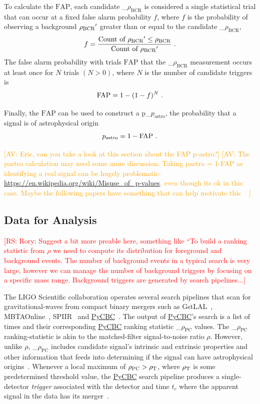 \documentclass[%
 nofootinbib,
 amsmath,amssymb,
 aps,
 twocolumn,
 superscriptaddress
]{revtex4-2}
\newcommand{\gstlal}{{\sc GstLAL}\xspace}
\newcommand{\spiir}{{\sc SPIIR}\xspace}
\newcommand{\mbta}{{\sc MBTAOnline}\xspace}
\newcommand{\pycbc}{{\sc \href{https://pycbc.org/}{{PyCBC}}}\xspace}
\newcommand{\fancytext}[1]{{\relax\ifmmode#1\else $#1$\fi}\xspace}
\newcommand{\mathcmd}[1]{{\sc \relax\ifmmode#1\else $#1$\fi}\xspace}
\newcommand{\bcr}{\mathcmd{\rho_\text{BCR}}}
\newcommand{\pycbcstat}{\mathcmd{\rho_\text{PC}}}
\newcommand{\snr}{\mathcmd{\rho}}
\newcommand{\fap}{\mathcmd{\text{FAP}}}
\newcommand{\pastro}{\fancytext{p_\text{astro}}}
\newcommand{\avi}[1]{\textcolor{orange}{[AV: #1]}}
\newcommand{\rs}[1]{\textcolor{red}{[RS: #1]}}
\begin{document}
To calculate the \fap, each candidate \bcr is considered a single statistical trial that can occur at a fixed false alarm probability $f$, where $f$ is the probability of observing a background $\bcr'$ greater than or equal to the candidate \bcr,
\begin{equation}
    f = \frac{\text{Count of } \bcr' \leq \bcr}{\text{Count of } \bcr'} \ .
\end{equation}
The false alarm probability with trials \fap that the \bcr measurement occurs at least once for $N$ trials $(N > 0)$, where $N$ is the number of candidate triggers is
\begin{equation}
    \fap = 1 - (1-f)^N \ .
\end{equation}


Finally, the \fap can be used to construct a \pastro, the probability that a signal is of astrophysical origin~\cite{pastro_1,pastro_2,pastro_3}
\begin{equation}
    \pastro = 1 -  \fap \ .
\end{equation}

\avi{Eric, can you take a look at this section about the FAP p-astro?}
\avi{
The pastro calculation may need some more discussion. Taking pastro = 1-FAP as identifying a real signal can be hugely problematic: \url{https://en.wikipedia.org/wiki/Misuse_of_p-values}, even though its ok in this case. Maybe the following papers have something that can help motivate this ~\cite{Farr:2015:PhRvD, Gaebel:2019:MNRAS,Galaudage:2020:PhRvD}
}


\subsection{Data for Analysis}

\rs{Rory: Suggest a bit more preable here, something like ``To build a ranking statistic from $\rho$ we need to compute its distribution for foreground and background events. The number of background events in a typical search is very large, however we can manage the number of background triggers by focusing on a specific mass range. Background triggers are generated by search pipelines...}

The LIGO Scientific collaboration operates several search pipelines that scan for gravitational-waves from compact binary mergers such as \gstlal~\cite{sachdev2019gstlal}, \mbta~\cite{MBTA}, \spiir~\cite{spiir} and \pycbc~\cite{pycbc_og4}. The output of \pycbc's search is a list of times and their corresponding \pycbc ranking statistic \pycbcstat values. The \pycbcstat ranking-statistic is akin to the matched-filter signal-to-noise ratio \snr. However, unlike \snr, \pycbcstat includes candidate signal's intrinsic and extrinsic properties and other information that feeds into determining if the signal can have astrophysical origins~\cite{pycbc_og6}. Whenever a local maximum of $\pycbcstat > \snr_\text{T}$, where $\snr_\text{T}$ is some predetermined threshold value, the \pycbc search pipeline produces a single-detector \textit{trigger} associated with the detector and time $t_c$ where the apparent signal in the data has its merger~\cite{pycbc_og6}.
\end{document}
